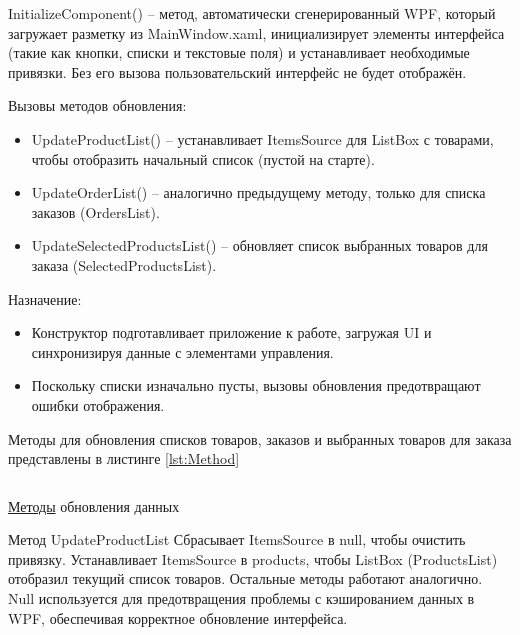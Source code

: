\documentclass[12pt]{article}
\newcommand{\colorGIT}[1]{\textcolor{CtpLavender}{#1}}
\renewcommand{\texttt}[1]{{\small\ttfamily #1}}
\begin{document}
\texttt{InitializeComponent()} -- метод, автоматически сгенерированный \texttt{WPF}, который загружает разметку из \texttt{MainWindow.xaml}, инициализирует элементы интерфейса (такие как кнопки, списки и текстовые поля) и устанавливает необходимые привязки. Без его вызова пользовательский интерфейс не будет отображён.

\noindent Вызовы методов обновления:
\begin{itemize}
	\item \texttt{UpdateProductList()} -- устанавливает \texttt{ItemsSource} для \texttt{ListBox} с товарами, чтобы отобразить начальный список (пустой на старте).
	\item \texttt{UpdateOrderList()} -- аналогично предыдущему методу, только для списка заказов (\texttt{Or\-dersList}).
	\item \texttt{UpdateSelectedProductsList()} -- обновляет список выбранных товаров для заказа (\texttt{Sel\-ected\-ProductsList}).
\end{itemize}

\noindent Назначение:
\begin{itemize}
	\item Конструктор подготавливает приложение к работе, загружая \texttt{UI} и синхронизируя данные с элементами управления.
	\item Поскольку списки изначально пусты, вызовы обновления предотвращают ошибки отображения.
\end{itemize}

Методы для обновления списков товаров, заказов и выбранных товаров для заказа
представлены в листинге \ref{lst:Method}

\begin{listing}[H]
	\inputminted[firstline=32, lastline=51]{csharp}{../../3lab/StoreManager/MainWindow.xaml.cs}
	\caption{\colorGIT{\href{https://github.com/WebMasterIT/Csharp_Labs/blob/ec375afd16c0647b337cf3d8a79c8bef904fc1be/3lab/StoreManager/MainWindow.xaml.cs\#L32-L51}{Методы}} обновления данных}
	\label{lst:Method}
\end{listing}

Метод \texttt{UpdateProductList} Сбрасывает \texttt{ItemsSource} в \texttt{null}, чтобы очистить привязку. Устанавливает \texttt{ItemsSource} в \texttt{products}, чтобы \texttt{ListBox} (\texttt{ProductsList}) отобразил текущий список товаров. Остальные методы работают аналогично. \texttt{Null} используется для предотвращения проблемы с кэшированием данных в \texttt{WPF}, обеспечивая корректное обновление интерфейса.
\end{document}
